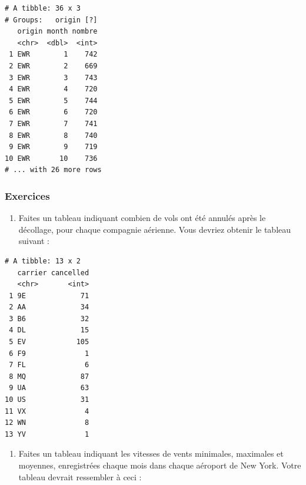 \documentclass[a4paperpaper,]{article}
\newenvironment{Shaded}{\begin{snugshade}}{\end{snugshade}}
\newcommand{\KeywordTok}[1]{\textcolor[rgb]{0.13,0.29,0.53}{\textbf{#1}}}
\newcommand{\DataTypeTok}[1]{\textcolor[rgb]{0.13,0.29,0.53}{#1}}
\newcommand{\StringTok}[1]{\textcolor[rgb]{0.31,0.60,0.02}{#1}}
\newcommand{\OperatorTok}[1]{\textcolor[rgb]{0.81,0.36,0.00}{\textbf{#1}}}
\newcommand{\NormalTok}[1]{#1}
\providecommand{\tightlist}{%
  \setlength{\itemsep}{0pt}\setlength{\parskip}{0pt}}
\theoremstyle{definition}
\theoremstyle{definition}
\theoremstyle{definition}
\theoremstyle{remark}
\begin{document}
\begin{Shaded}
\end{Shaded}

\begin{verbatim}
# A tibble: 36 x 3
# Groups:   origin [?]
   origin month nombre
   <chr>  <dbl>  <int>
 1 EWR        1    742
 2 EWR        2    669
 3 EWR        3    743
 4 EWR        4    720
 5 EWR        5    744
 6 EWR        6    720
 7 EWR        7    741
 8 EWR        8    740
 9 EWR        9    719
10 EWR       10    736
# ... with 26 more rows
\end{verbatim}

\subsubsection{Exercices}\label{exercices-9}

\begin{enumerate}
\def\labelenumi{\arabic{enumi}.}
\tightlist
\item
  Faites un tableau indiquant combien de vols ont été annulés après le
  décollage, pour chaque compagnie aérienne. Vous devriez obtenir le
  tableau suivant :
\end{enumerate}

\begin{verbatim}
# A tibble: 13 x 2
   carrier cancelled
   <chr>       <int>
 1 9E             71
 2 AA             34
 3 B6             32
 4 DL             15
 5 EV            105
 6 F9              1
 7 FL              6
 8 MQ             87
 9 UA             63
10 US             31
11 VX              4
12 WN              8
13 YV              1
\end{verbatim}

\begin{enumerate}
\def\labelenumi{\arabic{enumi}.}
\setcounter{enumi}{1}
\tightlist
\item
  Faites un tableau indiquant les vitesses de vents minimales, maximales
  et moyennes, enregistrées chaque mois dans chaque aéroport de New
  York. Votre tableau devrait ressembler à ceci :
\end{enumerate}
\end{document}
